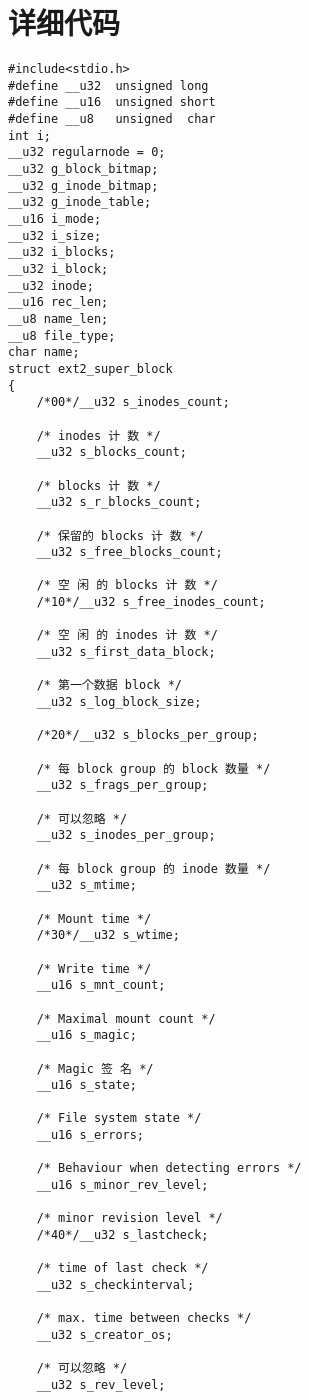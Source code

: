 \documentclass[UTF8]{ctexart}
\begin{document}
\section{详细代码}
\begin{verbatim}
#include<stdio.h>
#define __u32  unsigned long
#define __u16  unsigned short
#define __u8   unsigned  char
int i;
__u32 regularnode = 0;
__u32 g_block_bitmap;
__u32 g_inode_bitmap;
__u32 g_inode_table;
__u16 i_mode;
__u32 i_size;
__u32 i_blocks;
__u32 i_block;
__u32 inode;
__u16 rec_len;
__u8 name_len;
__u8 file_type;
char name;
struct ext2_super_block
{
    /*00*/__u32 s_inodes_count;

    /* inodes 计 数 */
    __u32 s_blocks_count;

    /* blocks 计 数 */
    __u32 s_r_blocks_count;

    /* 保留的 blocks 计 数 */
    __u32 s_free_blocks_count;

    /* 空 闲 的 blocks 计 数 */
    /*10*/__u32 s_free_inodes_count;

    /* 空 闲 的 inodes 计 数 */
    __u32 s_first_data_block;

    /* 第一个数据 block */
    __u32 s_log_block_size;

    /*20*/__u32 s_blocks_per_group;

    /* 每 block group 的 block 数量 */
    __u32 s_frags_per_group;

    /* 可以忽略 */
    __u32 s_inodes_per_group;

    /* 每 block group 的 inode 数量 */
    __u32 s_mtime;

    /* Mount time */
    /*30*/__u32 s_wtime;

    /* Write time */
    __u16 s_mnt_count;

    /* Maximal mount count */
    __u16 s_magic;

    /* Magic 签 名 */
    __u16 s_state;

    /* File system state */
    __u16 s_errors;

    /* Behaviour when detecting errors */
    __u16 s_minor_rev_level;

    /* minor revision level */
    /*40*/__u32 s_lastcheck;

    /* time of last check */
    __u32 s_checkinterval;

    /* max. time between checks */
    __u32 s_creator_os;

    /* 可以忽略 */
    __u32 s_rev_level;


\end{verbatim}
\end{document}
